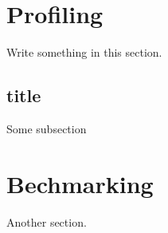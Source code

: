 \section{Profiling}
Write something in this section.

\subsection{title}
Some subsection 

\section{Bechmarking}
Another section.